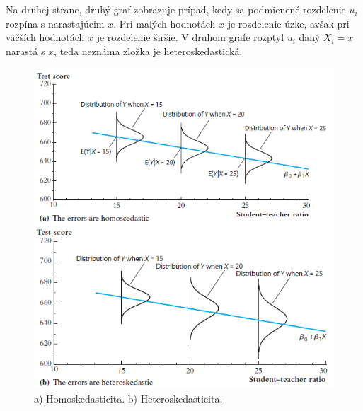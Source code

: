 \documentclass[]{tukediphc}
\begin{document}
Na druhej strane, druhý graf zobrazuje prípad, kedy sa podmienené rozdelenie ${u}_{i}$ rozpína s narastajúcim $x$. Pri malých hodnotách $x$ je rozdelenie úzke, avšak pri väčších hodnotách $x$ je rozdelenie širšie. V druhom grafe rozptyl ${u}_{i}$ daný $X_{i} = x$ narastá s $x$, teda neznáma zložka je heteroskedastická. 
\begin{figure}[!ht] 
    \centering 
    \includegraphics[scale = 1.25]{diplomka obrazky/13.png} 
    \caption{a) Homoskedasticita. b) Heteroskedasticita.} 
\end{figure} 
\end{document}
